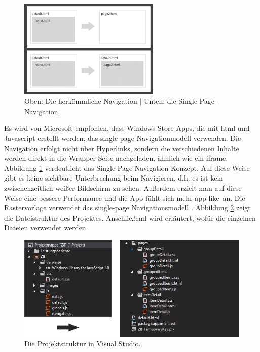 \documentclass[12pt,a4paper,bibtotoc,abstracton]{scrartcl}
\begin{document}
\begin{figure}[h]
	\centering
	\includegraphics[width=0.6\textwidth]{Bilder/Abbildungen/single_page.png} 
	\caption[Die Single-Page-Navigation]{Oben: Die herkömmliche Navigation | Unten: die Single-Page-Navigation. \citep{MicrosoftSinglePage2013}}
	\label{fig:single-page}
\end{figure}

Es wird von Microsoft empfohlen, dass Windows-Store Apps, die mit \ac{html} und Javascript erstellt werden, das single-page Navigationmodell verwenden. Die Navigation erfolgt nicht über Hyperlinks, sondern die verschiedenen Inhalte werden direkt in die Wrapper-Seite nachgeladen, ähnlich wie ein iframe. Abbildung \ref{fig:single-page} verdeutlicht das Single-Page-Navigation Konzept. Auf diese Weise gibt es keine sichtbare Unterbrechung beim Navigieren, d.h. es ist kein zwischenzeitlich weißer Bildschirm zu sehen. Außerdem erzielt man auf diese Weise eine bessere Performance und die App fühlt sich mehr \glqq app-like\grqq\ an. Die Rastervorlage verwendet das single-page Navigationsmodell \citep{MicrosoftSinglePage2013}. Abbildung \ref{fig:projektmappe} zeigt die Dateistruktur des Projektes. Anschließend wird erläutert, wofür die einzelnen Dateien verwendet werden.


\begin{figure}[h]
	\centering
	\includegraphics[width=\textwidth]{Bilder/Screenshots/app/projektmappe.png} 
	\caption{Die Projektstruktur in Visual Studio.}
	\label{fig:projektmappe}
\end{figure}
\end{document}
